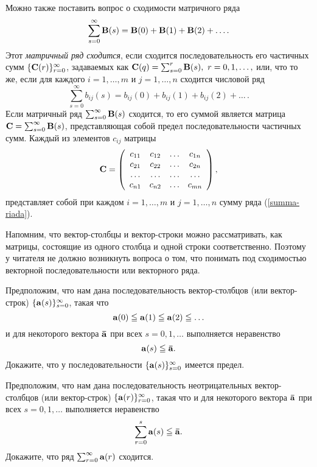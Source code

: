     Можно также поставить вопрос о сходимости матричного ряда
    \[\sum_{s=0}^{\infty}\mathbf{B}(s)=\mathbf{B}(0)+\mathbf{B}(1)+\mathbf{B}(2)+\ldots .\]
    Этот \emph{матричный ряд сходится}, если сходится
    последовательность его частичных сумм
    $\{\mathbf{C}(r)\}_{r=0}^{\infty}$, задаваемых как
    $\vc{C}(q)=\sum_{s=0}^{r}\vc{B}(s), \ r=0,1,\ldots,$
     или, что то же, если для каждого $i=1,\ldots,m$ и
    $j=1,\ldots,n$ сходится числовой ряд
\begin{equation} \label{summa-riada}
    \sum_{s=0}^{\infty}b_{ij}(s)=b_{ij}(0)+b_{ij}(1)+b_{ij}(2)+\ldots\, .
\end{equation}
    Если матричный ряд $\sum_{s=0}^{\infty}\mathbf{B}(s)$ сходится, то
    его суммой является матрица
    $\mathbf{C}=\sum_{s=0}^{\infty}\mathbf{B}(s)$, представляющая собой
    предел последовательности частичных сумм. Каждый из
    элементов $c_{ij}$ матрицы
    \[\mathbf{C}=\left(
    \begin{array}{cccc}
   c_{11} & c_{12} & \ldots & c_{1n} \\
   c_{21} & c_{22} & \ldots & c_{2n} \\
   \ldots& \ldots &\ldots &\ldots \\
   c_{n1} & c_{n2} & \ldots & c_{mn}
\end{array}
\right), \]
    представляет собой при каждом $i=1,\ldots,m$ и
    $j=1,\ldots,n$ сумму ряда (\ref{summa-riada}).

    Напомним, что вектор-столбцы и вектор-строки можно
    рассматривать, как матрицы, состоящие из одного столбца и одной
    строки соответственно. Поэтому у читателя не должно возникнуть
    вопроса о том, что понимать под сходимостью векторной последовательности
    или векторного ряда.

\begin{exer}
    Предположим, что нам дана последовательность вектор-столбцов (или
    вектор-строк) $\{\mathbf{a}(s)\}_{s=0}^{\infty}$, такая что
    \[\mathbf{a}(0)\leqq\mathbf{a}(1)\leqq\mathbf{a}(2)\leqq\ldots\]
    и для некоторого вектора $\mathbf{\bar{a}}$ при всех $s=0,1,\ldots$
    выполняется неравенство
    \[\mathbf{a}(s)\leqq\mathbf{\bar{a}}.\]
    Докажите, что у последовательности
    $\{\mathbf{a}(s)\}_{s=0}^{\infty}$ имеется предел.
\end{exer}

\begin{exer} \label{riad-shoditsia}
    Предположим, что нам дана последовательность неотрицательных вектор-столбцов (или
    вектор-строк) $\{\mathbf{a}(r)\}_{r=0}^{\infty}$, такая что
    и для некоторого вектора $\mathbf{\bar{a}}$ при всех $s=0,1,\ldots$
    выполняется неравенство
    \[\sum_{r=0}^{s}\mathbf{a}(s)\leqq\mathbf{\bar{a}}.\]
    Докажите, что ряд
    $\sum_{r=0}^{\infty}\mathbf{a}(r)$ сходится.
\end{exer}

